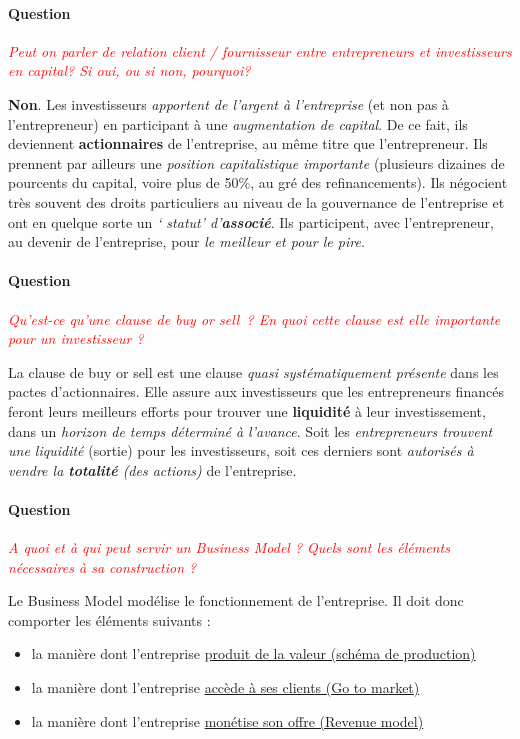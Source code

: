 \documentclass[12pt,oneside,a4paper]{article}
\newcommand{\question}[1]
{
\addtocounter{section}{1}
\paragraph*{Question \thesection}
\emph{\textcolor{red}{#1}}
}
\begin{document}
\question{Peut on parler de relation client / fournisseur entre entrepreneurs et investisseurs en capital? Si oui, ou si non, pourquoi?}

\textbf{Non}. Les investisseurs \emph{apportent de l’argent à l’entreprise} (et non pas à l’entrepreneur) en participant à une \emph{augmentation de capital}. De ce fait, ils deviennent \textbf{actionnaires} de l’entreprise, au même titre que l’entrepreneur. Ils prennent par ailleurs une \emph{position capitalistique importante} (plusieurs dizaines de pourcents du capital, voire plus de 50$ \%$, au gré des refinancements). Ils négocient très souvent des droits particuliers au niveau de la gouvernance de l’entreprise et ont en quelque sorte un\emph{ `	statut' d’\textbf{associé}}. Ils participent, avec l’entrepreneur, au devenir de l’entreprise, pour \emph{le meilleur et pour le pire}.

\question{Qu’est-ce qu’une clause de buy or sell ? En quoi cette clause est elle importante pour un investisseur ?}

La clause de buy or sell est une clause \emph{quasi systématiquement présente} dans les pactes d’actionnaires. Elle assure aux investisseurs que les entrepreneurs financés feront leurs meilleurs efforts pour trouver une \textbf{liquidité} à leur investissement, dans un \emph{horizon de temps déterminé à l’avance}. Soit les \emph{entrepreneurs trouvent une liquidité} (sortie) pour les investisseurs, soit ces derniers sont \emph{autorisés à vendre la \textbf{totalité} (des actions)} de l’entreprise.

\question{A quoi et à qui peut servir un Business Model ? Quels sont les éléments nécessaires à sa construction ? }

Le Business Model modélise le fonctionnement de l’entreprise. Il doit donc comporter les éléments suivants :

\begin{itemize}[label=]
\item la manière dont l’entreprise \underline{produit de la valeur (schéma de production)}
\item la manière dont l’entreprise \underline{accède à ses clients (Go to market)}
\item la manière dont l’entreprise \underline{monétise son offre (Revenue model)}
\end{itemize}
\end{document}
